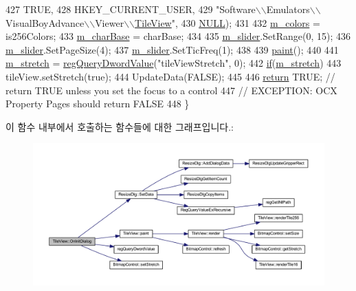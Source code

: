 \begin{DoxyCode}
427             TRUE,
428             HKEY\_CURRENT\_USER,
429             "Software\(\backslash\)\(\backslash\)Emulators\(\backslash\)\(\backslash\)VisualBoyAdvance\(\backslash\)\(\backslash\)Viewer\(\backslash\)\(\backslash\)\mbox{\hyperlink{class_tile_view}{TileView}}",
430             \mbox{\hyperlink{getopt1_8c_a070d2ce7b6bb7e5c05602aa8c308d0c4}{NULL}});
431 
432   \mbox{\hyperlink{class_tile_view_ad61048a17d2a93f3b8cb413d17a1533a}{m\_colors}} = is256Colors;
433   \mbox{\hyperlink{class_tile_view_a1fd549925ae533d9ce7215b8d5de4c63}{m\_charBase}} = charBase;
434 
435   \mbox{\hyperlink{class_tile_view_a3423f8bf0fe4b1bd0273d9ffbd3fb390}{m\_slider}}.SetRange(0, 15);
436   \mbox{\hyperlink{class_tile_view_a3423f8bf0fe4b1bd0273d9ffbd3fb390}{m\_slider}}.SetPageSize(4);
437   \mbox{\hyperlink{class_tile_view_a3423f8bf0fe4b1bd0273d9ffbd3fb390}{m\_slider}}.SetTicFreq(1);
438 
439   \mbox{\hyperlink{class_tile_view_a4341071a0cab0d5a8b6dfa7318230636}{paint}}();
440 
441   \mbox{\hyperlink{class_tile_view_a21a8f1dc56ad2e1107719d64fb206d2e}{m\_stretch}} = \mbox{\hyperlink{_reg_8cpp_a150640889ffff4851ee26d7b999ec7c3}{regQueryDwordValue}}("tileViewStretch", 0);
442   \mbox{\hyperlink{arm-new_8h_a93120066fd6daa54150af823953378d1}{if}}(\mbox{\hyperlink{class_tile_view_a21a8f1dc56ad2e1107719d64fb206d2e}{m\_stretch}})
443     tileView.setStretch(true);
444   UpdateData(FALSE);
445   
446   \mbox{\hyperlink{gb_codes_8h_a9717e7bbecb906637e86cef6da3d83c2}{return}} TRUE;  \textcolor{comment}{// return TRUE unless you set the focus to a control}
447                 \textcolor{comment}{// EXCEPTION: OCX Property Pages should return FALSE}
448 \}
\end{DoxyCode}
이 함수 내부에서 호출하는 함수들에 대한 그래프입니다.\+:
\nopagebreak
\begin{figure}[H]
\begin{center}
\leavevmode
\includegraphics[width=350pt]{class_tile_view_a597e32fa09187fe6ea909cca947bfbc1_cgraph}
\end{center}
\end{figure}
\mbox{\label{class_tile_view_ae4ba4c47c672fb6e856fbe3921e3667e}} 
